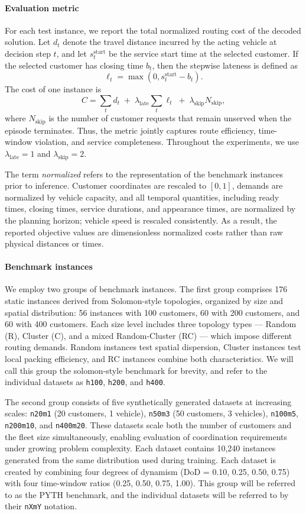 \documentclass[conference]{IEEEtran}
\begin{document}
\paragraph{Evaluation metric}
For each test instance, we report the total normalized routing cost of the decoded solution. Let $d_t$ denote the travel distance incurred by the acting vehicle at decision step $t$, and let $s_t^{\mathrm{start}}$ be the service start time at the selected customer. If the selected customer has closing time $b_t$, then the stepwise lateness is defined as
\[
\ell_t = \max(0, s_t^{\mathrm{start}} - b_t).
\]
The cost of one instance is
\[
C
=
\sum_t d_t
\;+\;
\lambda_{\mathrm{late}} \sum_t \ell_t
\;+\;
\lambda_{\mathrm{skip}} N_{\mathrm{skip}},
\]
where $N_{\mathrm{skip}}$ is the number of customer requests that remain unserved when the episode terminates. Thus, the metric jointly captures route efficiency, time-window violation, and service completeness. Throughout the experiments, we use $\lambda_{\mathrm{late}} = 1$ and $\lambda_{\mathrm{skip}} = 2$.

The term \emph{normalized} refers to the representation of the benchmark instances prior to inference. Customer coordinates are rescaled to $[0,1]$, demands are normalized by vehicle capacity, and all temporal quantities, including ready times, closing times, service durations, and appearance times, are normalized by the planning horizon; vehicle speed is rescaled consistently. As a result, the reported objective values are dimensionless normalized costs rather than raw physical distances or times.

\paragraph{Benchmark instances}
We employ two groups of benchmark instances. The first group comprises 176 static instances derived from Solomon-style topologies, organized by size and spatial distribution: 56 instances with 100 customers, 60 with 200 customers, and 60 with 400 customers. Each size level includes three topology types --- Random (R), Cluster (C), and a mixed Random-Cluster (RC) --- which impose different routing demands. Random instances test spatial dispersion, Cluster instances test local packing efficiency, and RC instances combine both characteristics. We will call this group the solomon-style benchmark for brevity, and refer to the individual datasets as \texttt{h100}, \texttt{h200}, and \texttt{h400}.

The second group consists of five synthetically generated datasets at increasing scales: \texttt{n20m1} (20 customers, 1 vehicle), \texttt{n50m3} (50 customers, 3 vehicles), \texttt{n100m5}, \texttt{n200m10}, and \texttt{n400m20}. These datasets scale both the number of customers and the fleet size simultaneously, enabling evaluation of coordination requirements under growing problem complexity. Each dataset contains 10,240 instances generated from the same distribution used during training. Each dataset is created by combining four degrees of dynamism (DoD = 0.10, 0.25, 0.50, 0.75) with four time-window ratios (0.25, 0.50, 0.75, 1.00). This group will be referred to as the PYTH benchmark, and the individual datasets will be referred to by their \texttt{nXmY} notation.
\end{document}
